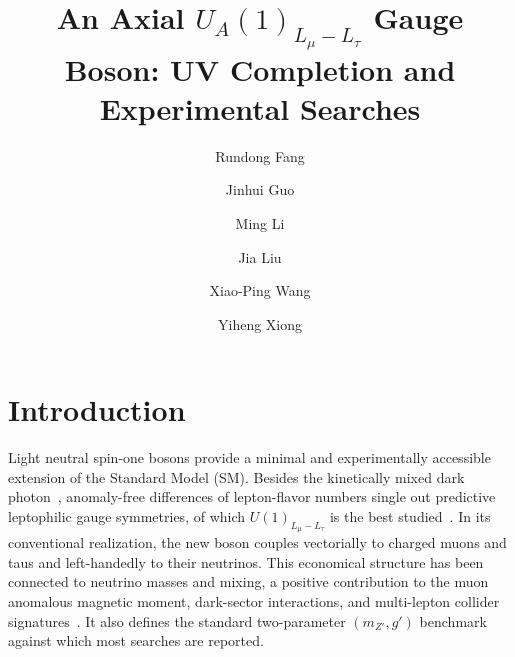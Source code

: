 \documentclass[onecolumn, aps, nofootinbib, prd, preprint, floats, floatfix, amsmath, amssymb, superscriptaddress, preprintnumbers]{revtex4-1}
\begin{document}
\title{An Axial $U_A(1)_{L_\mu-L_\tau}$ Gauge Boson: UV Completion and Experimental Searches}

\author{Rundong Fang}

\author{Jinhui Guo}

\author{Ming Li }

\author{Jia Liu }

\author{Xiao-Ping Wang  }

\author{Yiheng Xiong  }

\maketitle
\tableofcontents

\section{Introduction}
\label{sec:introduction}

Light neutral spin-one bosons provide a minimal and experimentally accessible extension of the Standard Model (SM). Besides the kinetically mixed dark photon~\cite{Holdom:1985ag}, anomaly-free differences of lepton-flavor numbers single out predictive leptophilic gauge symmetries, of which $U(1)_{L_\mu-L_\tau}$ is the best studied~\cite{Foot:1990mn,He:1990pn,He:1991qd}. In its conventional realization, the new boson couples vectorially to charged muons and taus and left-handedly to their neutrinos. This economical structure has been connected to neutrino masses and mixing, a positive contribution to the muon anomalous magnetic moment, dark-sector interactions, and multi-lepton collider signatures~\cite{Baek:2001kca,Ma:2001md,Heeck:2011wj,Harigaya:2013twa,Altmannshofer:2014cfa,Crivellin:2015mga,Altmannshofer:2016brv}. It also defines the standard two-parameter $(m_{Z'},g')$ benchmark against which most searches are reported.
\end{document}

